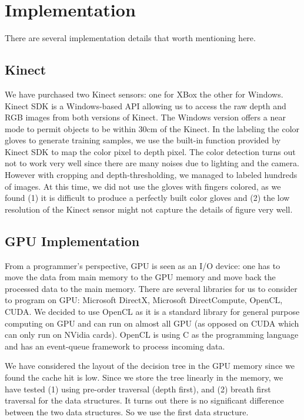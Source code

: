 \section{Implementation}
\label{sec: implementation}

There are several implementation details that worth mentioning here. 

\subsection{Kinect}
We have purchased two Kinect sensors: one for XBox the other for Windows. Kinect SDK is a Windows-based API allowing us to access the raw depth and RGB images from both versions of Kinect. The Windows version offers a near mode to permit objects to be within 30cm of the Kinect. In the labeling the color gloves to generate training samples, we use the built-in function provided by Kinect SDK to map the color pixel to depth pixel. The color detection turns out not to work very well since there are many noises due to lighting and the camera. However with cropping and depth-thresholding, we managed to labeled hundreds of images. At this time, we did not use the gloves with fingers colored, as we found (1) it is difficult to produce a perfectly built color gloves and (2) the low resolution of the Kinect sensor might not capture the details of figure very well.

\subsection{GPU Implementation}
From a programmer's perspective, GPU is seen as an I/O device: one has to move the data from main memory to the GPU memory and move back the processed data to the main memory. There are several libraries for us to consider to program on GPU: Microsoft DirectX, Microsoft DirectCompute, OpenCL, CUDA. We decided to use OpenCL as it is a standard library for general purpose computing on GPU and can run on almost all GPU (as opposed on CUDA which can only run on NVidia cards). OpenCL is using C as the programming language and has an event-queue framework to process incoming data. 

We have considered the layout of the decision tree in the GPU memory since we found the cache hit is low. Since we store the tree linearly in the memory, we have tested (1) using pre-order traversal (depth first), and (2) breath first traversal for the data structures. It turns out there is no significant difference between the two data structures. So we use the first data structure.  

